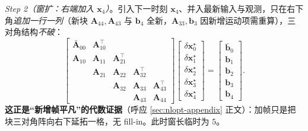 \begin{derivation}
\emph{Step 2（窗扩：右端加入 $\mathbf{x}_4$）}。引入下一时刻 $\mathbf{x}_4$、并入最新输入与观测，只在右下角\emph{追加一行一列}（新块 $\mathbf{A}_{44},\mathbf{A}_{43}$ 与 $\mathbf{b}_4$ 全新，$\mathbf{A}_{33},\mathbf{b}_3$ 因新增运动项需重算），三对角结构\emph{不破}：
\begin{equation}
\begin{bmatrix}
\bar{\mathbf{A}}_{00} & \mathbf{A}_{10}^\top & & & \\
\mathbf{A}_{10} & \mathbf{A}_{11} & \mathbf{A}_{21}^\top & & \\
 & \mathbf{A}_{21} & \mathbf{A}_{22} & \mathbf{A}_{32}^\top & \\
 & & \mathbf{A}_{32} & \mathbf{A}_{33} & \mathbf{A}_{43}^\top \\
 & & & \mathbf{A}_{43} & \mathbf{A}_{44}
\end{bmatrix}
\begin{bmatrix}\delta\mathbf{x}_0^\star\\ \delta\mathbf{x}_1^\star\\ \delta\mathbf{x}_2^\star\\ \delta\mathbf{x}_3^\star\\ \delta\mathbf{x}_4^\star\end{bmatrix}
=\begin{bmatrix}\bar{\mathbf{b}}_0\\ \mathbf{b}_1\\ \mathbf{b}_2\\ \mathbf{b}_3\\ \mathbf{b}_4\end{bmatrix}.
\label{eq:nlopt-swf-expand}
\end{equation}
\textbf{这正是“新增帧平凡”的代数证据}（呼应 \cref{sec:nlopt-appendix} 正文）：加帧只是把块三对角阵向右下延拓一格，无 fill-in。此时窗长临时为 $5$。


\end{derivation}
